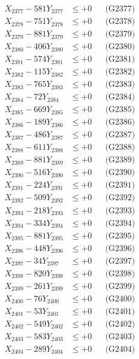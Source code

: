 \documentclass[a4paper,10pt]{article}
\begin{document}
{\begin{align}
X_{2377} - 581Y_{2377} &\leq +0 && \text{(G2377)} \\
X_{2378} - 751Y_{2378} &\leq +0 && \text{(G2378)} \\
X_{2379} - 881Y_{2379} &\leq +0 && \text{(G2379)} \\
X_{2380} - 406Y_{2380} &\leq +0 && \text{(G2380)} \\
\allowbreak
X_{2381} - 574Y_{2381} &\leq +0 && \text{(G2381)} \\
X_{2382} - 115Y_{2382} &\leq +0 && \text{(G2382)} \\
X_{2383} - 765Y_{2383} &\leq +0 && \text{(G2383)} \\
X_{2384} - 72Y_{2384} &\leq +0 && \text{(G2384)} \\
X_{2385} - 669Y_{2385} &\leq +0 && \text{(G2385)} \\
X_{2386} - 189Y_{2386} &\leq +0 && \text{(G2386)} \\
X_{2387} - 486Y_{2387} &\leq +0 && \text{(G2387)} \\
X_{2388} - 611Y_{2388} &\leq +0 && \text{(G2388)} \\
X_{2389} - 881Y_{2389} &\leq +0 && \text{(G2389)} \\
X_{2390} - 516Y_{2390} &\leq +0 && \text{(G2390)} \\
\allowbreak
X_{2391} - 224Y_{2391} &\leq +0 && \text{(G2391)} \\
X_{2392} - 509Y_{2392} &\leq +0 && \text{(G2392)} \\
X_{2393} - 218Y_{2393} &\leq +0 && \text{(G2393)} \\
X_{2394} - 334Y_{2394} &\leq +0 && \text{(G2394)} \\
X_{2395} - 881Y_{2395} &\leq +0 && \text{(G2395)} \\
X_{2396} - 448Y_{2396} &\leq +0 && \text{(G2396)} \\
X_{2397} - 34Y_{2397} &\leq +0 && \text{(G2397)} \\
X_{2398} - 820Y_{2398} &\leq +0 && \text{(G2398)} \\
X_{2399} - 261Y_{2399} &\leq +0 && \text{(G2399)} \\
X_{2400} - 76Y_{2400} &\leq +0 && \text{(G2400)} \\
\allowbreak
X_{2401} - 53Y_{2401} &\leq +0 && \text{(G2401)} \\
X_{2402} - 549Y_{2402} &\leq +0 && \text{(G2402)} \\
X_{2403} - 583Y_{2403} &\leq +0 && \text{(G2403)} \\
X_{2404} - 289Y_{2404} &\leq +0 && \text{(G2404)} \\

\end{align}}
\end{document}

